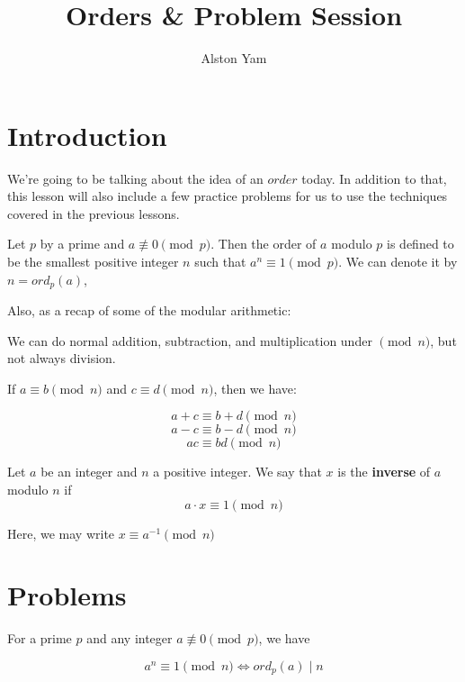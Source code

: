 \documentclass{article}
\title{Orders \& Problem Session}
\author{Alston Yam}
\date{}
\theoremstyle{mytheoremstyle}
\theoremstyle{mytheoremstyle}
\theoremstyle{myproblemstyle}
\begin{document}
    \maketitle

    \section{Introduction}
    We're going to be talking about the idea of an $\textit{order}$ today. In addition to that, this lesson will also include a few practice problems for us to use the techniques covered in the previous lessons.

    \begin{definition}[Orders]
        Let $p$ by a prime and $a \not \equiv 0 \pmod{p}$. Then the order of $a$ modulo $p$ is defined to be the smallest positive integer $n$ such that $a^n \equiv 1 \pmod{p}$. We can denote it by $n = ord_p(a)$,
    \end{definition}
    
    Also, as a recap of some of the modular arithmetic:
    \begin{theorem}
        We can do normal addition, subtraction, and multiplication under $\pmod{n}$, but not always division. 

        If $a \equiv b \pmod{n}$ and $c \equiv d \pmod{n}$, then we have:

        \[a + c \equiv b + d \pmod{n}\]
        \[a - c \equiv b - d \pmod{n}\]
        \[ac \equiv bd \pmod{n}\]
    \end{theorem}

    \begin{definition}
        Let $a$ be an integer and $n$ a positive integer. We say that $x$ is the \textbf{inverse} of $a$ modulo $n$ if 
        \[a \cdot x \equiv 1 \pmod{n}\]

        Here, we may write $x \equiv a^{-1} \pmod{n}$
    \end{definition}

    \section{Problems}

    \begin{problem}
        For a prime $p$ and any integer $a \not \equiv 0 \pmod{p}$, we have 
        
        \[a^n \equiv 1 \pmod{n} \iff ord_p(a) \mid n\]
    \end{problem}
\end{document}
